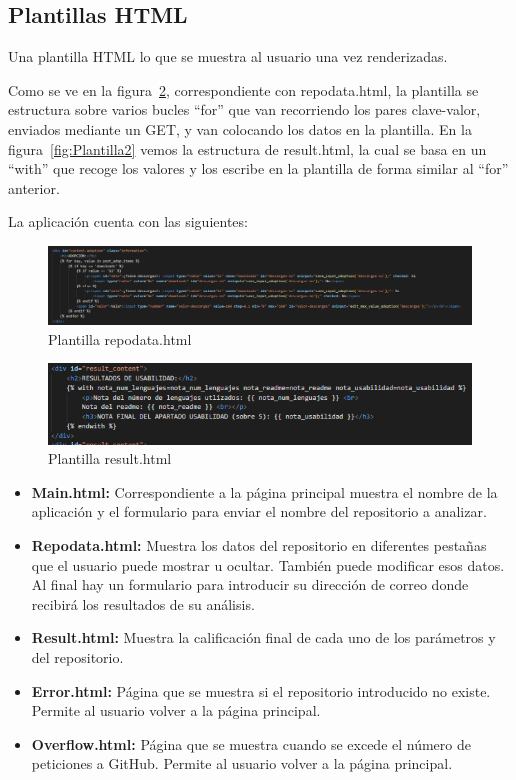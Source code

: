 \documentclass[a4paper, 12pt]{book}
\begin{document}
\subsection{Plantillas HTML}
Una plantilla HTML lo que se muestra al usuario una vez renderizadas.

Como se ve en la figura~\ref{fig:Plantilla1}, correspondiente con repo\textunderscore data.html, la plantilla se estructura sobre varios bucles ``for'' que van recorriendo los pares clave-valor, enviados mediante un GET, y van colocando los datos en la plantilla. En la figura~\ref{fig:Plantilla2} vemos la estructura de result.html, la cual se basa en un ``with'' que recoge los valores y los escribe en la plantilla de forma similar al ``for'' anterior.

La aplicación cuenta con las siguientes:

\begin{figure}
    \centering
    \includegraphics[width=1.15\textwidth, keepaspectratio]{img/plantilla_repo_data.png}
    \caption{Plantilla repo\textunderscore data.html}\label{fig:Plantilla1}
\end{figure}

\begin{figure}
    \centering
    \includegraphics[width=1.15\textwidth, keepaspectratio]{img/plantilla_result.png}
    \caption{Plantilla result.html}\label{fig:Plantilla1}
\end{figure}

\begin{itemize}
	\item \textbf{Main.html:} Correspondiente a la página principal muestra el nombre de la aplicación y el formulario para enviar el nombre del repositorio a analizar.
	\item \textbf{Repo\textunderscore data.html:} Muestra los datos del repositorio en diferentes pestañas que el usuario puede mostrar u ocultar. También puede modificar esos datos. Al final hay un formulario para introducir su dirección de correo donde recibirá los resultados de su análisis.
	\item \textbf{Result.html:} Muestra la calificación final de cada uno de los parámetros y del repositorio.
	\item \textbf{Error.html:} Página que se muestra si el repositorio introducido no existe. Permite al usuario volver a la página principal.
	\item \textbf{Overflow.html:} Página que se muestra cuando se excede el número de peticiones a GitHub. Permite al usuario volver a la página principal.
\end{itemize}
\end{document}
